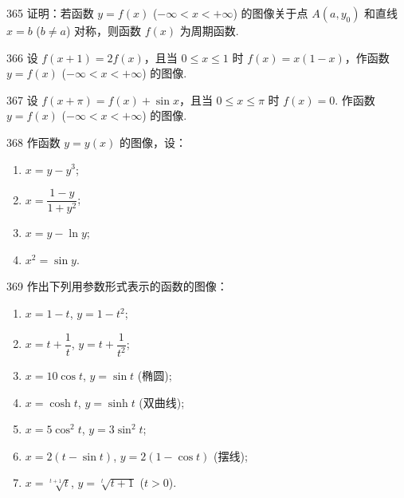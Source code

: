 \begin{prob}[M]{365}
证明：若函数 $y = f(x)$ ($-\infty < x < +\infty$) 的图像关于点 $A(a, y_0)$ 和直线 $x = b$ ($b \neq a$) 对称，则函数 $f(x)$ 为周期函数.
\end{prob}

\begin{prob}[M]{366}
设 $f(x + 1) = 2f(x)$，且当 $0 \leqslant x \leqslant 1$ 时 $f(x) = x(1 - x)$，作函数 $y = f(x)$ ($-\infty < x < +\infty$) 的图像.
\end{prob}

\begin{prob}[M]{367}
设 $f(x + \pi) = f(x) + \sin x$，且当 $0 \leqslant x \leqslant \pi$ 时 $f(x) = 0$. 作函数 $y = f(x)$ ($-\infty < x < +\infty$) 的图像.
\end{prob}

\begin{prob}[L]{368}
作函数 $y = y(x)$ 的图像，设：
\begin{enumerate}[label=(\alph*), itemsep=2pt, topsep=3pt]
  \item $x = y - y^3$;
  \item $x = \dfrac{1 - y}{1 + y^2}$;
  \item $x = y - \ln y$;
  \item $x^2 = \sin y$.
\end{enumerate}
\end{prob}

\begin{prob}[L]{369}
作出下列用参数形式表示的函数的图像：
\begin{enumerate}[label=(\alph*), itemsep=2pt, topsep=3pt]
  \item $x = 1 - t$, $y = 1 - t^2$;
  \item $x = t + \dfrac{1}{t}$, $y = t + \dfrac{1}{t^2}$;
  \item $x = 10\cos t$, $y = \sin t$ (椭圆);
  \item $x = \cosh t$, $y = \sinh t$ (双曲线);
  \item $x = 5\cos^2 t$, $y = 3\sin^2 t$;
  \item $x = 2(t - \sin t)$, $y = 2(1 - \cos t)$ (摆线);
  \item $x = \sqrt[t+1]{t}$, $y = \sqrt[t]{t + 1}$ ($t > 0$).
\end{enumerate}
\end{prob}

